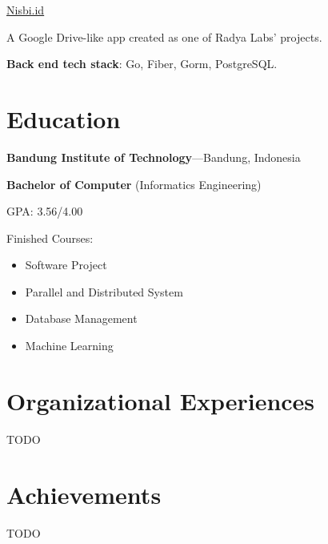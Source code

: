 \documentclass[10pt]{article}
\newcommand{\project}[3]{
    \noindent \href{#2}{#1}

    {#3}
}
\begin{document}
\project
    {Nisbi.id}
    {https://gitlab.com/alkademi/nisbi.id}
    {
        A Google Drive-like app created as one of Radya Labs’ projects.

        \textbf{Back end tech stack}: Go, Fiber, Gorm, PostgreSQL.
    }

\section{Education}

\textbf{Bandung Institute of Technology}---Bandung, Indonesia

\textbf{Bachelor of Computer} (Informatics Engineering)

GPA: 3.56/4.00

Finished Courses:
\begin{multicols}{2}
\begin{itemize}
    \item Software Project
    \item Parallel and Distributed System
    \item Database Management
    \item Machine Learning
\end{itemize}
\end{multicols}

\section{Organizational Experiences}

TODO

\section{Achievements}

TODO
\end{document}
